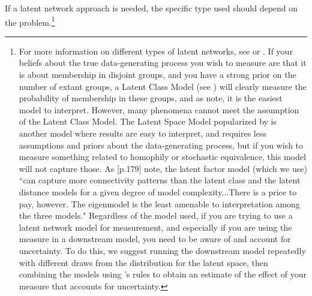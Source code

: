 If a latent network approach is needed, the specific type used should depend on the problem.\footnote{For more information on different types of latent networks, see \citet{minhas:etal:2018} or \citet{goldenberg:etal:2010}. If your beliefs about the true data-generating process you wish to measure are that it is about membership in disjoint groups, and you have a strong prior on the number of extant groups, a Latent Class Model (see \citet{airoldi:etal:2008}) will  clearly measure the probability of membership in these groups, and as \citet{goldenberg:etal:2010} note, it is the easiest model to interpret. However, many phenomena cannot meet the assumption of the Latent Class Model. The Latent Space Model popularized by \citet{handcock:etal:2008} is another model where results are easy to interpret, and requires less assumptions and priors about the data-generating process, but if you wish to measure something related to homophily or stochastic equivalence, this model will not capture those.  As \citet{goldenberg:etal:2010}[p.179] note, the latent factor model (which we use) ``can capture more connectivity patterns than the latent class and the latent distance models for a given degree of model complexity...There is a price to pay, however. The eigenmodel is the least amenable to interpretation among the three models." Regardless of the model used, if you are trying to use a latent network model for measurement, and especially if you are using the measure in a downstream model, you need to be aware of and account for uncertainty. To do this, we suggest running the downstream model repeatedly with different draws from the distribution for the latent space, then combining the models using \citet{rubin:1976}'s rules to obtain an estimate of the effect of your measure that accounts for uncertainty.}

